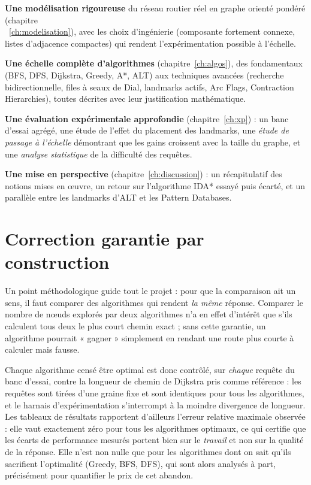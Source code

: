\begin{bulletlist}
  \item \textbf{Une modélisation rigoureuse} du réseau routier réel en graphe
        orienté pondéré (chapitre \\~\ref{ch:modelisation}), avec les choix
        d'ingénierie (composante fortement connexe, listes d'adjacence
        compactes) qui rendent l'expérimentation possible à l'échelle.
  \item \textbf{Une échelle complète d'algorithmes} (chapitre~\ref{ch:algos}),
        des fondamentaux (BFS, DFS, Dijkstra, Greedy, A*, ALT) aux techniques
        avancées (recherche bidirectionnelle, files à seaux de Dial, landmarks
        actifs, Arc Flags, Contraction Hierarchies), toutes décrites avec leur
        justification mathématique.
  \item \textbf{Une évaluation expérimentale approfondie}
        (chapitre~\ref{ch:xp}) : un banc d'essai agrégé, une étude de l'effet du
        placement des landmarks, une \emph{étude de passage à l'échelle}
        démontrant que les gains croissent avec la taille du graphe, et une
        \emph{analyse statistique} de la difficulté des requêtes.
  \item \textbf{Une mise en perspective} (chapitre~\ref{ch:discussion}) : un
        récapitulatif des notions mises en œuvre, un retour sur l'algorithme IDA*
        essayé puis écarté, et un parallèle entre les landmarks d'ALT et les
        Pattern Databases.
\end{bulletlist}

\section{Correction garantie par construction}
\label{sec:correctness}

Un point méthodologique guide tout le projet : pour que la comparaison ait un
sens, il faut comparer des algorithmes qui rendent \emph{la même} réponse.
Comparer le nombre de nœuds explorés par deux algorithmes n'a en effet d'intérêt
que s'ils calculent tous deux le plus court chemin exact ; sans cette garantie,
un algorithme pourrait « gagner » simplement en rendant une route plus courte à
calculer mais fausse.

\medskip

Chaque algorithme censé être optimal est donc contrôlé, sur \emph{chaque} requête
du banc d'essai, contre la longueur de chemin de Dijkstra pris comme référence :
les requêtes sont tirées d'une graine fixe et sont identiques pour tous les
algorithmes, et le harnais d'expérimentation s'interrompt à la moindre
divergence de longueur. Les tableaux de résultats rapportent d'ailleurs l'erreur
relative maximale observée : elle vaut exactement zéro pour tous les algorithmes
optimaux, ce qui certifie que les écarts de performance mesurés portent bien sur
le \emph{travail} et non sur la qualité de la réponse. Elle n'est non nulle que
pour les algorithmes dont on sait qu'ils sacrifient l'optimalité (Greedy, BFS,
DFS), qui sont alors analysés à part, précisément pour quantifier le prix de cet
abandon.
